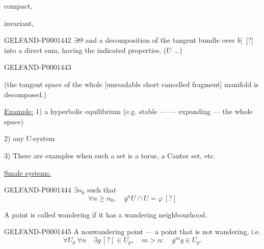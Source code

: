 compact,

invariant,

\begin{GelfandAdjacentEvidence}{GELFAND-P000144}{2}
$\exists\Theta$ and a decomposition of the tangent bundle over $b\vert$\, [?] into a direct sum,
having the indicated properties. ($U$ $\ldots$)
\end{GelfandAdjacentEvidence}
\begin{GelfandAdjacentEvidence}{GELFAND-P000144}{3}

(the tangent space of the whole [unreadable short cancelled fragment] manifold is decomposed.)
\end{GelfandAdjacentEvidence}

\underline{Example:} 1) a hyperbolic equilibrium
(e.g. stable — — expanding — the whole space)

2) any $U$-system

3) There are examples when such a set is a torus, a Cantor set, etc.

\underline{Smale systems.}


\begin{GelfandAdjacentEvidence}{GELFAND-P000144}{4}
 $\exists n_0$ such that
\begin{equation*}
\forall n\ge n_0,\quad g^n U\cap U=\varphi\, [?]
\end{equation*}
\end{GelfandAdjacentEvidence}

A point is called wandering if it has a wandering neighbourhood.

\begin{GelfandAdjacentEvidence}{GELFAND-P000144}{5}
A nonwandering point — a point that is not wandering, i.e.
\begin{equation*}
\forall U_p\ \forall n\quad \exists g\, [?]\in U_p,\quad m>n:\quad g^m q\in U_p.
\end{equation*}
\end{GelfandAdjacentEvidence}

